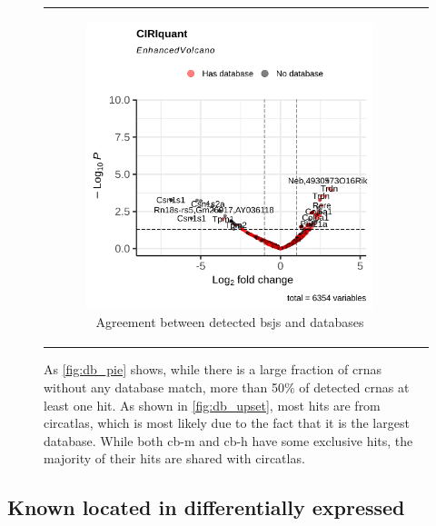 \begin{figure}[H]
\begin{tabular}{cc}
\begin{subfigure}{0.5\textwidth}
            \includegraphics[width=\linewidth]{chapters/4_results_and_discussion/figures/dea/ciriquant/letrozole/volcano.png}
            \caption{Agreement between detected
                \glspl{bsj} and databases}
            \label{fig:letrozole_volcano_ciriquant}
        \end{subfigure} &

    \end{tabular}
    \caption{As \cref{fig:db_pie} shows, while there is a large fraction of
        \glspl{crna} without any
        database match, more than 50\% of detected \glspl{crna} at least one
        hit.
        As shown in \cref{fig:db_upset}, most hits are from \gls{circatlas}, which is
        most likely due to the fact that it is the largest database.
        While both \gls{cb-m} and \gls{cb-h} have some exclusive hits, the majority of
        their hits are shared with \gls{circatlas}.
    }
    \label{fig:letrozole_volcano}
\end{figure}

\subsection{Known  located in differentially expressed
    }
